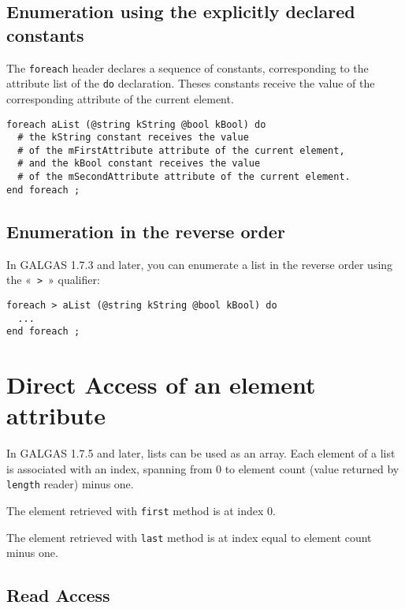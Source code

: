 \subsection{Enumeration using the explicitly declared constants}

The \lstinline[language=galgas]!foreach! header declares a sequence of constants, corresponding to the attribute list of the \lstinline[language=galgas]!do! declaration. Theses constants receive the value of the corresponding attribute of the current element.


\begin{lstlisting}[language=galgas]
foreach aList (@string kString @bool kBool) do
  # the kString constant receives the value
  # of the mFirstAttribute attribute of the current element,
  # and the kBool constant receives the value
  # of the mSecondAttribute attribute of the current element.
end foreach ;
\end{lstlisting}

\subsection{Enumeration in the reverse order}

In GALGAS 1.7.3 and later, you can enumerate a list in the reverse order using the «~\lstinline[language=galgas]!>!~» qualifier:

\begin{lstlisting}[language=galgas]
foreach > aList (@string kString @bool kBool) do
  ...
end foreach ;
\end{lstlisting}




\section{Direct Access of an element attribute}

In GALGAS 1.7.5 and later, lists can be used as an array. Each element of a list is associated with an  index, spanning from 0 to element count (value returned by \lstinline[language=galgas]!length! reader) minus one.

The element retrieved with \lstinline[language=galgas]!first! method is at index 0.

The element retrieved with \lstinline[language=galgas]!last! method is at index equal to element count minus one.

\subsection{Read Access}

